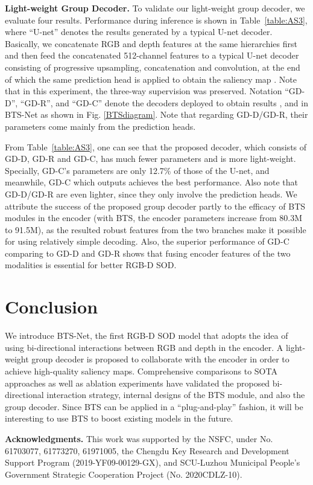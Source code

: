 \documentclass{article}
\begin{document}
 \textbf{Light-weight Group Decoder.} To validate our light-weight group decoder, we evaluate four results. Performance during inference is shown in Table~\ref{table:AS3}, where ``U-net'' denotes the results generated by a typical U-net decoder. Basically, we concatenate RGB and depth features at the same hierarchies first and then feed the concatenated 512-channel features to a typical U-net decoder consisting of progressive upsampling, concatenation and convolution, at the end of which the same prediction head is applied to obtain the saliency map . Note that in this experiment, the 
three-way supervision was preserved. Notation ``GD-D'', ``GD-R'', and ``GD-C'' denote the decoders deployed to obtain results ,  and  in BTS-Net as shown in Fig. \ref{BTSdiagram}. Note that regarding GD-D/GD-R, their parameters come mainly from the prediction heads.
 
 From Table~\ref{table:AS3}, one can see that the proposed decoder, which consists of GD-D, GD-R and GD-C, has much fewer parameters and is more light-weight. Specially, GD-C's parameters are only 12.7\% of those of the U-net, and meanwhile, GD-C which outputs  achieves the best performance. Also note that GD-D/GD-R are even lighter, since they only involve the prediction heads. We attribute the success of the proposed group decoder partly to the efficacy of BTS modules in the encoder (with BTS, the encoder parameters increase from 80.3M to 91.5M), as the resulted robust features from the two branches make it possible for using relatively simple decoding. Also, the superior performance of GD-C comparing to GD-D and GD-R shows that fusing encoder features of the two modalities is essential for better RGB-D SOD.
 \vspace{-0.2cm}
 \section{Conclusion}\vspace{-0.2cm}
We introduce BTS-Net, the first RGB-D SOD model that adopts the idea of using bi-directional interactions between RGB and depth in the encoder. A light-weight group decoder is proposed to collaborate with the encoder in order to achieve high-quality saliency maps. Comprehensive comparisons to SOTA approaches as well as ablation experiments have validated the proposed bi-directional interaction strategy, internal designs of the BTS module, and also the group decoder. Since BTS can be applied in a ``plug-and-play'' fashion, it will be interesting to use BTS to boost existing models in the future.    

\vspace{-2pt}
\small{\vspace{.1in}\noindent\textbf{Acknowledgments.}\quad
This work was supported by the NSFC, under No. 61703077, 61773270, 61971005, the Chengdu Key Research and Development Support Program (2019-YF09-00129-GX), and SCU-Luzhou Municipal People's Government Strategic Cooperation Project (No. 2020CDLZ-10).}

\footnotesize
{


}
\end{document}
